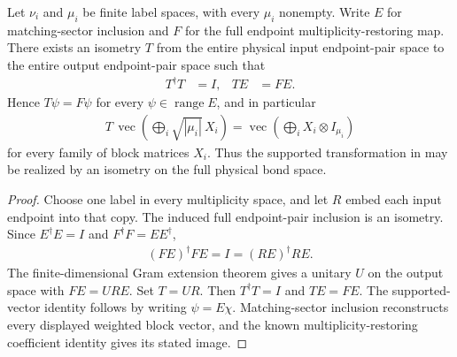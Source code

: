 \begin{lemma}%
    \label{thm:peps_full_multiplicity_bond_isometry_extension}
    \leanok
    Let $\nu_i$ and $\mu_i$ be finite label spaces, with every $\mu_i$ nonempty.
    Write $E$ for matching-sector inclusion and $F$ for the full endpoint
    multiplicity-restoring map. There exists an isometry $T$ from the entire
    physical input endpoint-pair space to the entire output endpoint-pair space
    such that
    \begin{align}
        T^\dagger T & =I, & TE & =FE.
    \end{align}
    Hence $T\psi=F\psi$ for every $\psi\in\operatorname{range}E$, and in particular
    \begin{align}
        T\,\operatorname{vec}\left(
        \bigoplus_i\sqrt{|\mu_i|}\,X_i\right)
        =\operatorname{vec}\left(\bigoplus_iX_i\otimes I_{\mu_i}\right)
    \end{align}
    for every family of block matrices $X_i$.
    Thus the supported transformation in \cite[Section~7]{Schuch2010PEPS}
    may be realized by an isometry on the full physical bond space.
\end{lemma}

\begin{proof}\leanok
    Choose one label in every multiplicity space, and let $R$ embed each input
    endpoint into that copy. The induced full endpoint-pair inclusion is an
    isometry. Since $E^\dagger E=I$ and $F^\dagger F=EE^\dagger$,
    \begin{align}
        (FE)^\dagger FE=I=(RE)^\dagger RE.
    \end{align}
    The finite-dimensional Gram extension theorem gives a unitary $U$ on the
    output space with $FE=URE$. Set $T=UR$. Then $T^\dagger T=I$ and $TE=FE$.
    The supported-vector identity follows by writing $\psi=E\chi$.
    Matching-sector inclusion reconstructs every displayed weighted block
    vector, and the known multiplicity-restoring coefficient identity gives
    its stated image.
\end{proof}
